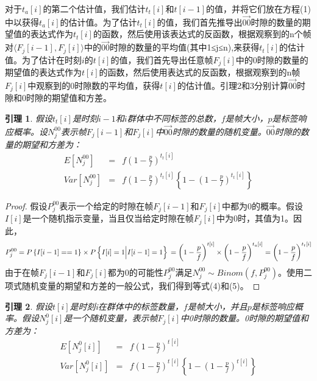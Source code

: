 \documentclass[UTF8]{ctexart}
\newtheorem{lemma}{引理}
\newtheorem*{proof}{证明}
\begin{document}
对于$t_a[i]$的第二个估计值，我们估计$t_t[i]$和$t[i-1]$的值，并将它们放在方程(1)中以获得$t_a[i]$的估计值。为了估计$t_t[i]$的值，我们首先推导出$\overrightarrow{00}$时隙的数量的期望值的表达式作为$t_t[i]$的函数，然后使用该表达式的反函数，根据观察到的n个帧对$\langle F_j[i-1],F_j[i]\rangle$中的$\overrightarrow{00}$时隙的数量的平均值(其中1≤j≤n),来获得$t_t[i]$的估计值。为了估计在时刻$i$的$t[i]$的值，我们首先导出任意帧$F_j[i]$中的0时隙的数量的期望值的表达式作为$t[i]$的函数，然后使用表达式的反函数，根据观察到的n帧$F_j[i]$中观察到的0时隙数的平均值，获得$t[i]$的估计值。引理2和3分别计算$\overrightarrow{00}$时隙和0时隙的期望值和方差。

\begin{lemma}
假设$t_t[i]$是时刻$i-1$和$i$群体中不同标签的总数，$f$是帧大小，$p$是标签响应概率。设$N^{00}_j$表示帧$F_j[i-1]$和$F_j[i]$中$\overrightarrow{00}$时隙的数量的随机变量。$\overrightarrow{00}$时隙的数量的期望和方差为：
\begin{eqnarray}
E[N^{00}_j]&=&f\left(1-\frac{p}{f}\right)^{t_t[i]}\\
Var[N^{00}_j]&=& f\left(1-\frac{p}{f}\right)^{t_t[i]}\left\{1-\left(1-\frac{p}{f}\right)^{t_t[i]}\right\}
\end{eqnarray}
\end{lemma}

\begin{proof}
假设$P^{00}_j$表示一个给定的时隙在帧$F_j[i-1]$和$F_j[i]$中都为0的概率。假设$I[i]$是一个随机指示变量，当且仅当给定时隙在帧$F_j[i]$中为0时，其值为1。因此，
\begin{equation}
P^{00}_j=P\left\{I[i-1]==1\right\}\times P\left\{I[i]=1\Big|I[i-1]=1\right\}\\
=\left(1-\frac{p}{f}\right)^{t[i]}\times\left(1-\frac{p}{f}\right)^{t_a[i]}=\left(1-\frac{p}{f}\right)^{t_t[i]}
\end{equation}
由于在帧$F_j[i-1]$和$F_j[i]$都为0的可能性$P^{00}_j$满足$N^{00}_j\sim Binom(f,P^{00}_j)$。使用二项式随机变量的期望和方差的一般公式，我们得到等式(4)和(5)。	
\end{proof}

\begin{lemma}
假设$t[i]$是时刻i在群体中的标签数量，$f$是帧大小，并且$p$是标签响应概率。假设$N^0_j[i]$是一个随机变量，表示帧$F_j [i]$中0时隙的数量。0时隙的期望值和方差为：
\begin{eqnarray}
E[N^0_j[i]]&=&f\left(1-\frac{p}{f}\right)^{t[i]}\\
Var[N^0_j[i]]&=&f\left(1-\frac{p}{f}\right)^{t[i]}\left\{1-\left(1-\frac{p}{f}\right)^{t[i]}\right\}
\end{eqnarray}
\end{lemma}
\end{document}
